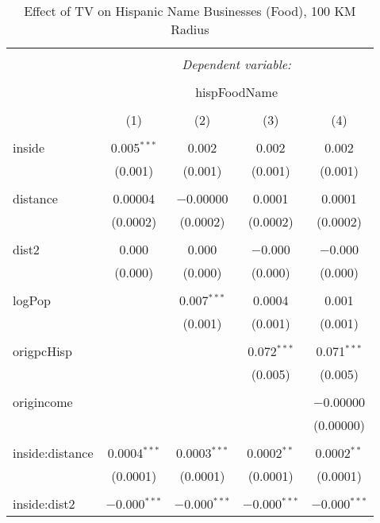 
\begin{table}[!htbp] \centering 
  \caption{Effect of TV on Hispanic Name Businesses (Food), 100 KM Radius} 
  \label{} 
\begin{tabular}{@{\extracolsep{-5pt}}lcccc} 
\\[-1.8ex]\hline 
\hline \\[-1.8ex] 
 & \multicolumn{4}{c}{\textit{Dependent variable:}} \\ 
\cline{2-5} 
\\[-1.8ex] & \multicolumn{4}{c}{hispFoodName} \\ 
\\[-1.8ex] & (1) & (2) & (3) & (4)\\ 
\hline \\[-1.8ex] 
 inside & 0.005$^{***}$ & 0.002 & 0.002 & 0.002 \\ 
  & (0.001) & (0.001) & (0.001) & (0.001) \\ 
  & & & & \\ 
 distance & 0.00004 & $-$0.00000 & 0.0001 & 0.0001 \\ 
  & (0.0002) & (0.0002) & (0.0002) & (0.0002) \\ 
  & & & & \\ 
 dist2 & 0.000 & 0.000 & $-$0.000 & $-$0.000 \\ 
  & (0.000) & (0.000) & (0.000) & (0.000) \\ 
  & & & & \\ 
 logPop &  & 0.007$^{***}$ & 0.0004 & 0.001 \\ 
  &  & (0.001) & (0.001) & (0.001) \\ 
  & & & & \\ 
 origpcHisp &  &  & 0.072$^{***}$ & 0.071$^{***}$ \\ 
  &  &  & (0.005) & (0.005) \\ 
  & & & & \\ 
 origincome &  &  &  & $-$0.00000 \\ 
  &  &  &  & (0.00000) \\ 
  & & & & \\ 
 inside:distance & 0.0004$^{***}$ & 0.0003$^{***}$ & 0.0002$^{**}$ & 0.0002$^{**}$ \\ 
  & (0.0001) & (0.0001) & (0.0001) & (0.0001) \\ 
  & & & & \\ 
 inside:dist2 & $-$0.000$^{***}$ & $-$0.000$^{***}$ & $-$0.000$^{***}$ & $-$0.000$^{***}$ \\ 

\end{tabular}
\end{table}
